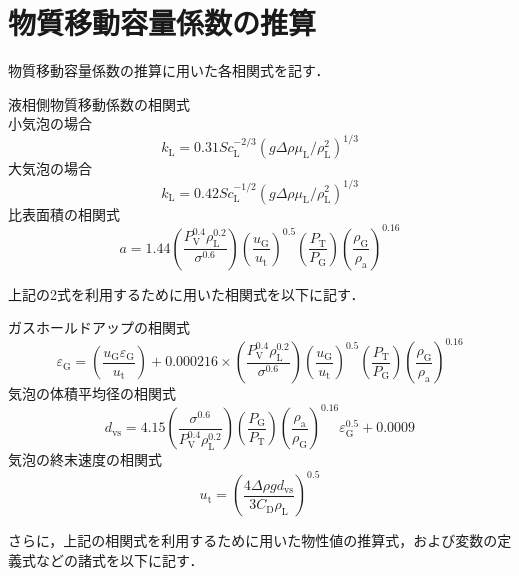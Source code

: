 \section{物質移動容量係数の推算}
物質移動容量係数の推算に用いた各相関式を記す．

液相側物質移動係数の相関式\\
小気泡の場合
\begin{equation}
    k_\mathrm{L} = 0.31Sc_\mathrm{L}^{-2/3}(g \varDelta \rho \mu_\mathrm{L}/\rho_\mathrm{L}^2)^{1/3}
\end{equation}
大気泡の場合
\begin{equation}
    k_\mathrm{L} = 0.42Sc_\mathrm{L}^{-1/2}(g \varDelta \rho \mu_\mathrm{L}/\rho_\mathrm{L}^2)^{1/3}
\end{equation}
比表面積の相関式
\begin{equation}
    a = 1.44 \left( \frac{P_\mathrm{V}^{0.4} \rho_\mathrm{L}^{0.2} }{ \sigma^{0.6}} \right) \left( \frac{u_\mathrm{G}}{u_\mathrm{t}} \right)^{0.5} \left( \frac{P_\mathrm{T}}{P_\mathrm{G}} \right) \left( \frac{\rho_\mathrm{G}}{\rho_\mathrm{a}} \right)^{0.16}
\end{equation}

上記の2式を利用するために用いた相関式を以下に記す．

ガスホールドアップの相関式
\begin{equation}
    \varepsilon_{{\mathrm G}} = \left( \frac{u_{{\mathrm G}}\varepsilon_{{\mathrm G}}}{u_{{\mathrm t}}} \right) + 0.000216 \times \left( \frac{P_\mathrm{V}^{0.4} \rho_\mathrm{L}^{0.2} }{ \sigma^{0.6}} \right) \left( \frac{u_\mathrm{G}}{u_\mathrm{t}} \right)^{0.5} \left( \frac{P_\mathrm{T}}{P_\mathrm{G}} \right) \left( \frac{\rho_\mathrm{G}}{\rho_\mathrm{a}} \right)^{0.16}
\end{equation}
気泡の体積平均径の相関式
\begin{equation}
    d_\mathrm{vs} = 4.15 \left( \frac{\sigma^{0.6}}{P_\mathrm{V}^{0.4} \rho_\mathrm{L}^{0.2}} \right) \left( \frac{P_\mathrm{G}}{P_\mathrm{T}} \right) \left( \frac{\rho_\mathrm{a}}{\rho_\mathrm{G}} \right) ^{0.16} \varepsilon_\mathrm{G}^{0.5} + 0.0009
{}\end{equation}
気泡の終末速度の相関式
\begin{equation}
    u_\mathrm{t} = \left( \frac{4\varDelta \rho g d_\mathrm{vs}}{3C_\mathrm{D} \rho_\mathrm{L}} \right)^{0.5}
\end{equation}

さらに，上記の相関式を利用するために用いた物性値の推算式，および変数の定義式などの諸式を以下に記す．


